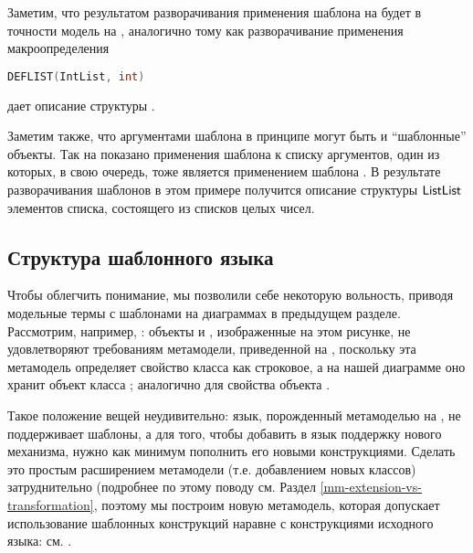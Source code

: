 Заметим, что результатом разворачивания применения шаблона на  будет в точности модель на , аналогично тому как разворачивание применения макроопределения
\begin{lstlisting}[language=C]
DEFLIST(IntList, int)
\end{lstlisting}
дает описание структуры .

Заметим также, что аргументами шаблона в принципе могут быть и ``шаблонные'' объекты. 
%
%
Так на  показано применения шаблона  к списку аргументов, один из которых, в свою очередь, тоже является применением шаблона . В результате разворачивания шаблонов в этом примере получится описание структуры $\mathsf{ListList}$ элементов списка, состоящего из списков целых чисел.

\subsection{Структура шаблонного языка}

Чтобы облегчить понимание, мы позволили себе некоторую вольность, приводя модельные термы с шаблонами на диаграммах в предыдущем разделе. Рассмотрим, например, : объекты  и , изображенные на этом рисунке, не удовлетворяют требованиям метамодели, приведенной на , поскольку эта метамодель определяет свойство  класса  как строковое, а на нашей диаграмме оно хранит объект класса ; аналогично для свойства  объекта . 

Такое положение вещей неудивительно: язык, порожденный метамоделью на , не поддерживает шаблоны, а для того, чтобы добавить в язык поддержку нового механизма, нужно как минимум пополнить его новыми конструкциями. Сделать это простым расширением метамодели (т.е. добавлением новых классов) затруднительно (подробнее по этому поводу см. Раздел \ref{mm-extension-vs-transformation}, поэтому мы построим новую метамодель, которая допускает использование шаблонных конструкций наравне с конструкциями исходного языка: см. .

